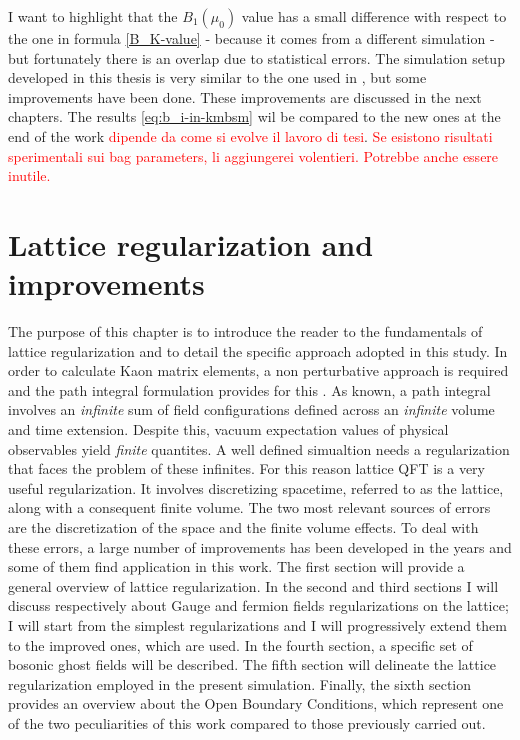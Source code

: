 \documentclass[english, LaM, oneside, noexaminfo]{sapthesis}
\newcommand{\colr}{\textcolor{red}}
\newcommand{\obc}{Open Boundary Conditions}
\begin{document}
I want to highlight that the $B_1(\mu_0)$ value has a small difference with respect to the one in formula \ref{B_K-value} - because it comes from a different simulation - but fortunately there is an overlap due to statistical errors.
The simulation setup developed in this thesis is very similar to the one used in \cite{KMBSM}, but some improvements have been done.
These improvements are discussed in the next chapters.
The results \ref{eq:b_i-in-kmbsm} wil be compared to the new ones at the end of the work \colr{dipende da come si evolve il lavoro di tesi}.
\colr{Se esistono risultati sperimentali sui bag parameters, li aggiungerei volentieri. Potrebbe anche essere inutile.}

\chapter{Lattice regularization and improvements}\label{ch:lattice-regularization}
\lettrine[lines=2, findent=3pt, nindent=0pt]{T}{}he purpose of this chapter is to introduce the reader to the fundamentals of lattice regularization and to detail the specific approach adopted in this study.
\newline
In order to calculate Kaon matrix elements, a non perturbative approach is required and the path integral formulation provides for this \cite{Itzykson-Zuber}.
As known, a path integral involves an \textit{infinite} sum of field configurations defined across an \textit{infinite} volume and time extension.
Despite this, vacuum expectation values of physical observables yield \textit{finite} quantites.
A well defined simualtion needs a regularization that faces the problem of these infinites.
For this reason lattice QFT is a very useful regularization.
It involves discretizing spacetime, referred to as the lattice, along with a consequent finite volume.
The two most relevant sources of errors are the discretization of the space and the finite volume effects.
To deal with these errors, a large number of improvements has been developed in the years and some of them find application in this work.
\newline
The first section will provide a general overview of lattice regularization.
In the second and third sections I will discuss respectively about Gauge and fermion fields regularizations on the lattice;
I will start from the simplest regularizations and I will progressively extend them to the improved ones, which are used.
In the fourth section, a specific set of bosonic ghost fields will be described.
The fifth section will delineate the lattice regularization employed in the present simulation.
Finally, the sixth section provides an overview about the \obc, which represent one of the two peculiarities of this work compared to those previously carried out.
\end{document}
